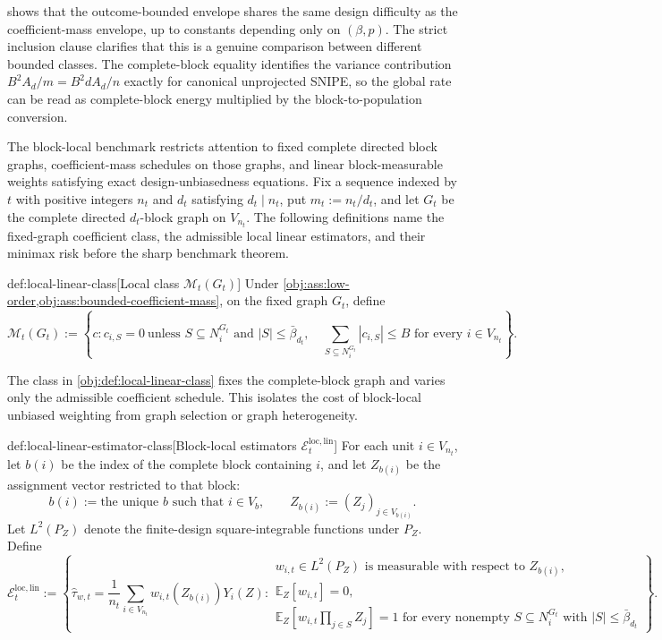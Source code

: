 \documentclass[11pt]{article}
\begin{document}
 shows that the outcome-bounded envelope shares the same design difficulty as the coefficient-mass envelope, up to constants depending only on \((\beta,p)\). The strict inclusion clause clarifies that this is a genuine comparison between different bounded classes. The complete-block equality identifies the variance contribution \(B^2A_d/m=B^2dA_d/n\) exactly for canonical unprojected SNIPE, so the global rate can be read as complete-block energy multiplied by the block-to-population conversion.

The block-local benchmark restricts attention to fixed complete directed block graphs, coefficient-mass schedules on those graphs, and linear block-measurable weights satisfying exact design-unbiasedness equations. Fix a sequence indexed by \(t\) with positive integers \(n_t\) and \(d_t\) satisfying \(d_t\mid n_t\), put \(m_t:=n_t/d_t\), and let \(G_t\) be the complete directed \(d_t\)-block graph on \(V_{n_t}\). The following definitions name the fixed-graph coefficient class, the admissible local linear estimators, and their minimax risk before the sharp benchmark theorem.

\begin{definitionv}{def:local-linear-class}[Local class \(\mathcal M_t(G_t)\)]
Under \cref{obj:ass:low-order,obj:ass:bounded-coefficient-mass}, on the fixed graph \(G_t\), define
\[
\mathcal M_t(G_t)
:=
\left\{
c:
c_{i,S}=0\ \text{unless } S\subseteq N_i^{G_t}\text{ and } |S|\le \bar\beta_{d_t},
\quad
\sum_{S\subseteq N_i^{G_t}} |c_{i,S}|\le B
\text{ for every } i\in V_{n_t}
\right\}.
\]
\end{definitionv}

The class in \cref{obj:def:local-linear-class} fixes the complete-block graph and varies only the admissible coefficient schedule. This isolates the cost of block-local unbiased weighting from graph selection or graph heterogeneity.

\begin{definitionv}{def:local-linear-estimator-class}[Block-local estimators $\mathcal E_t^{\mathrm{loc,lin}}$]
For each unit \(i\in V_{n_t}\), let \(b(i)\) be the index of the complete block containing \(i\), and let \(Z_{b(i)}\) be the assignment vector restricted to that block:
\[
b(i)
:=
\text{the unique } b \text{ such that } i\in V_b,
\qquad
Z_{b(i)}
:=
(Z_j)_{j\in V_{b(i)}}.
\]
Let \(L^2(P_Z)\) denote the finite-design square-integrable functions under \(P_Z\). Define
\[
\mathcal E_t^{\mathrm{loc,lin}}
:=
\left\{
\widehat\tau_{w,t}
=
\frac{1}{n_t}\sum_{i\in V_{n_t}} w_{i,t}(Z_{b(i)})Y_i(Z):
\begin{array}{l}
w_{i,t}\in L^2(P_Z)\text{ is measurable with respect to }Z_{b(i)},\\
\mathbb E_Z[w_{i,t}]=0,\\
\mathbb E_Z\left[w_{i,t}\prod_{j\in S}Z_j\right]=1
\text{ for every nonempty }S\subseteq N_i^{G_t}
\text{ with }|S|\le\bar\beta_{d_t}
\end{array}
\right\}.
\]
\end{definitionv}
\end{document}
